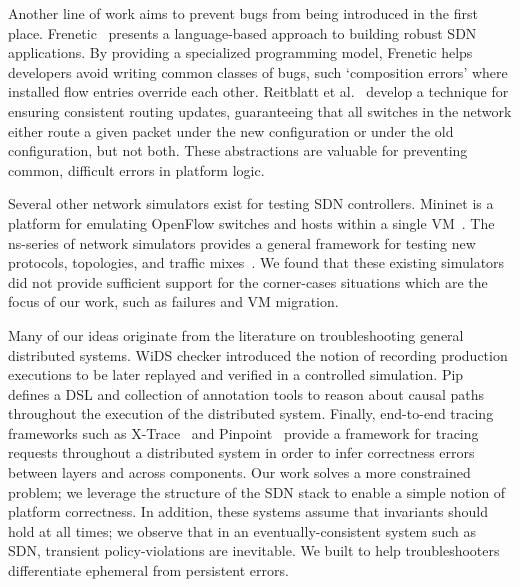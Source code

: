 Another line of work aims to prevent bugs from being introduced in the first
place. Frenetic~\cite{frenetic} presents a language-based approach to building
robust SDN applications. By providing a specialized programming model,
 Frenetic helps developers avoid writing common classes of
bugs, such `composition errors' where installed flow entries override each other.
Reitblatt et al.~\cite{consistentupdates} develop a technique for ensuring
consistent routing updates, guaranteeing that all switches in the network either route
a given packet under the new configuration or under the old configuration,
but not both. These abstractions are valuable for preventing common, difficult errors
in platform logic.

Several other network simulators exist for testing SDN controllers. Mininet is a 
platform for emulating OpenFlow switches and hosts within a single
 VM~\cite{Lantz:2010:NLR:1868447.1868466}. The ns-series of network simulators
provides a general framework for testing new protocols, topologies,
and traffic mixes~\cite{ns3}. We found that these existing simulators did
not provide sufficient support for the corner-cases situations which are the
focus of our work, such as failures and VM migration.

Many of our ideas originate from the literature on troubleshooting general
distributed systems. WiDS checker introduced the notion of recording
production executions to be later replayed and verified in a controlled simulation.
Pip~\cite{pip} defines a DSL and collection of annotation tools to
reason about causal paths throughout the execution of the
distributed system. Finally, end-to-end tracing
frameworks such as X-Trace~\cite{Fonseca:2007:XPN:1973430.1973450} and 
Pinpoint~\cite{Chen02pinpoint:problem} provide a framework for tracing requests throughout 
a distributed system in order to infer correctness errors between layers and
across components. Our work solves a more constrained problem; we leverage
the structure of the SDN stack to enable a simple notion of platform
correctness. In addition, these systems assume that invariants should hold at
all times; we observe that in an eventually-consistent system such as SDN,
transient policy-violations are inevitable. We built \simulator{} to help troubleshooters
differentiate ephemeral from persistent errors. 


